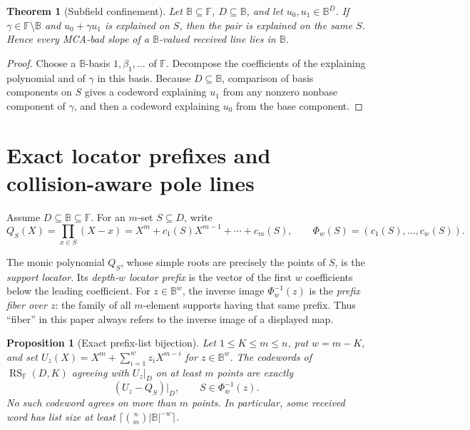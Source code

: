 \documentclass[11pt,a4paper]{amsart}
\numberwithin{equation}{section}
\newtheorem{theorem}{Theorem}[section]
\newtheorem{proposition}[proposition]{Proposition}
\theoremstyle{remark}
\DeclareMathOperator{\RS}{RS}
\newcommand{\F}{\mathbb F}
\newcommand{\B}{\mathbb B}
\newcommand{\abs}[1]{\lvert #1\rvert}
\begin{document}
\begin{theorem}[Subfield confinement]\label{thm:subfield-confinement-full}
Let \(\B\subseteq\F\), \(D\subseteq\B\), and let \(u_0,u_1\in\B^D\).  If
\(\gamma\in\F\setminus\B\) and \(u_0+\gamma u_1\) is explained on \(S\),
then the pair is explained on the same \(S\).  Hence every MCA-bad slope of
a \(\B\)-valued received line lies in \(\B\).
\end{theorem}

\begin{proof}
Choose a \(\B\)-basis \(1,\beta_1,\ldots\) of \(\F\).  Decompose the
coefficients of the explaining polynomial and of \(\gamma\) in this basis.
Because \(D\subseteq\B\), comparison of basis components on \(S\) gives a
codeword explaining \(u_1\) from any nonzero nonbase component of
\(\gamma\), and then a codeword explaining \(u_0\) from the base component.
\end{proof}

\section{Exact locator prefixes and collision-aware pole lines}
\label{sec:exact-prefix-pole}

Assume \(D\subseteq\B\subseteq\F\).  For an \(m\)-set \(S\subseteq D\),
write
\[
 Q_S(X)=\prod_{x\in S}(X-x)
       =X^m+c_1(S)X^{m-1}+\cdots+c_m(S),
 \qquad
 \Phi_w(S)=(c_1(S),\ldots,c_w(S)).
\]

The monic polynomial \(Q_S\), whose simple roots are precisely the points
of \(S\), is the \emph{support locator}.  Its \emph{depth-\(w\) locator
prefix} is the vector of the first \(w\) coefficients below the leading
coefficient.  For \(z\in\B^w\), the inverse image
\(\Phi_w^{-1}(z)\) is the \emph{prefix fiber over \(z\)}: the family of
all \(m\)-element supports having that same prefix.  Thus ``fiber'' in this
paper always refers to the inverse image of a displayed map.

\begin{proposition}[Exact prefix-list bijection]\label{prop:exact-prefix-list}
Let \(1\le K\le m\le n\), put \(w=m-K\), and set
\(U_z(X)=X^m+\sum_{i=1}^wz_iX^{m-i}\) for \(z\in\B^w\).  The codewords of
\(\RS_\F(D,K)\) agreeing with \(U_z|_D\) on at least \(m\) points are
exactly
\[
        (U_z-Q_S)|_D,\qquad S\in\Phi_w^{-1}(z).
 \tag{4.1}\label{eq:prefix-bijection}
\]
No such codeword agrees on more than \(m\) points.  In particular, some
received word has list size at least
\(\lceil\binom nm\abs\B^{-w}\rceil\).
\end{proposition}
\end{document}
